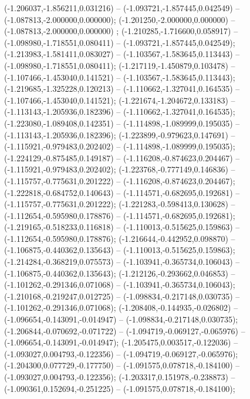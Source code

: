  (-1.206037,-1.856211,0.031216) -- (-1.093721,-1.857445,0.042549) -- (-1.087813,-2.000000,0.000000);
 (-1.201250,-2.000000,0.000000) -- (-1.087813,-2.000000,0.000000) ;
 (-1.210285,-1.716600,0.058917) -- (-1.098980,-1.718551,0.080411) -- (-1.093721,-1.857445,0.042549);
 (-1.213983,-1.581411,0.083027) -- (-1.103567,-1.583645,0.113443) -- (-1.098980,-1.718551,0.080411);
 (-1.217119,-1.450879,0.103478) -- (-1.107466,-1.453040,0.141521) -- (-1.103567,-1.583645,0.113443);
 (-1.219685,-1.325228,0.120213) -- (-1.110662,-1.327041,0.164535) -- (-1.107466,-1.453040,0.141521);
 (-1.221674,-1.204672,0.133183) -- (-1.113143,-1.205936,0.182396) -- (-1.110662,-1.327041,0.164535);
 (-1.223080,-1.089408,0.142351) -- (-1.114898,-1.089999,0.195035) -- (-1.113143,-1.205936,0.182396);
 (-1.223899,-0.979623,0.147691) -- (-1.115921,-0.979483,0.202402) -- (-1.114898,-1.089999,0.195035);
 (-1.224129,-0.875485,0.149187) -- (-1.116208,-0.874623,0.204467) -- (-1.115921,-0.979483,0.202402);
 (-1.223768,-0.777149,0.146836) -- (-1.115757,-0.775631,0.201222) -- (-1.116208,-0.874623,0.204467);
 (-1.222818,-0.684752,0.140643) -- (-1.114571,-0.682695,0.192681) -- (-1.115757,-0.775631,0.201222);
 (-1.221283,-0.598413,0.130628) -- (-1.112654,-0.595980,0.178876) -- (-1.114571,-0.682695,0.192681);
 (-1.219165,-0.518233,0.116818) -- (-1.110013,-0.515625,0.159863) -- (-1.112654,-0.595980,0.178876);
 (-1.216644,-0.442952,0.098870) -- (-1.106875,-0.440362,0.135643) -- (-1.110013,-0.515625,0.159863);
 (-1.214284,-0.368219,0.075573) -- (-1.103941,-0.365734,0.106043) -- (-1.106875,-0.440362,0.135643);
 (-1.212126,-0.293662,0.046853) -- (-1.101262,-0.291346,0.071068) -- (-1.103941,-0.365734,0.106043);
 (-1.210168,-0.219247,0.012725) -- (-1.098834,-0.217148,0.030735) -- (-1.101262,-0.291346,0.071068);
 (-1.208408,-0.144935,-0.026802) -- (-1.096654,-0.143091,-0.014947) -- (-1.098834,-0.217148,0.030735);
 (-1.206844,-0.070692,-0.071722) -- (-1.094719,-0.069127,-0.065976) -- (-1.096654,-0.143091,-0.014947);
 (-1.205475,0.003517,-0.122036) -- (-1.093027,0.004793,-0.122356) -- (-1.094719,-0.069127,-0.065976);
 (-1.204300,0.077729,-0.177750) -- (-1.091575,0.078718,-0.184100) -- (-1.093027,0.004793,-0.122356);
 (-1.203317,0.151978,-0.238873) -- (-1.090361,0.152694,-0.251225) -- (-1.091575,0.078718,-0.184100);
